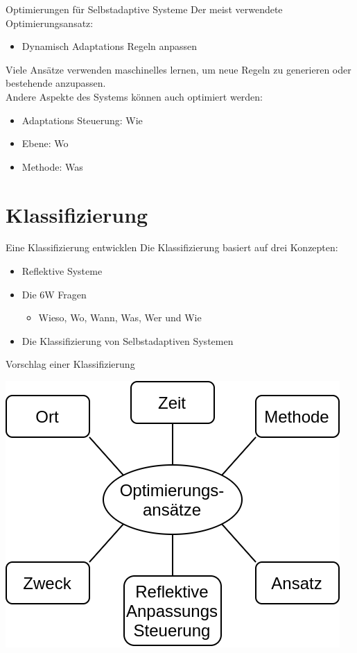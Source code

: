 \documentclass[de,16:9]{sdqbeamer}
\begin{document}
\begin{frame}{Optimierungen für Selbstadaptive Systeme}
	Der meist verwendete Optimierungsansatz:
	\begin{itemize}
		\item Dynamisch Adaptations Regeln anpassen
	\end{itemize}
	\medskip
	Viele Ansätze verwenden maschinelles lernen, um neue Regeln zu generieren
	oder bestehende anzupassen. \\
	\medskip
	Andere Aspekte des Systems können auch optimiert werden:
	\begin{itemize}
		\item Adaptations Steuerung: Wie
		\item Ebene: Wo
		\item Methode: Was
	\end{itemize}
\end{frame}

\section{Klassifizierung}

\begin{frame}{Eine Klassifizierung entwicklen}
	Die Klassifizierung basiert auf drei Konzepten:
	\begin{itemize}
		\item Reflektive Systeme \cite{FORMS}
		\item Die 6W Fragen \cite{LandscapeAndResearchChallenges}
		\begin{itemize}
			\item Wieso, Wo, Wann, Was, Wer und Wie
		\end{itemize}
		\item Die Klassifizierung von Selbstadaptiven Systemen \cite{SurveyOnEngineeringApproaches}
	\end{itemize}
\end{frame}

\begin{frame}{Vorschlag einer Klassifizierung}
	\begin{center}
		\includegraphics[width=.45\textwidth]{sources/ClassificationProposal-Proposal_DE.png}
	\end{center}
\end{frame}
\end{document}
